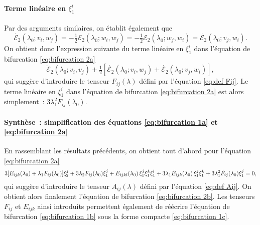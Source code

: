\documentclass{article}
\newcommand{\nocomma}{}
\begin{document}
\paragraph{Terme lin{\'e}aire en $\xi_1^i$}Par des arguments similaires, on
{\'e}tablit {\'e}galement que
\[ \dot{\mathcal{E}_2} (\lambda_0 ; v_i, w_j) = - \tfrac{1}{2} \mathcal{E}_2
   (\lambda_0 ; w_i, w_j) = - \tfrac{1}{2} \mathcal{E}_2 (\lambda_0 ; w_j,
   w_i) = \dot{\mathcal{E}_2} (\lambda_0 ; v_j, w_i) . \]
On obtient donc l'expression suivante du terme lin{\'e}aire en $\xi_1^i$ dans
l'{\'e}quation de bifurcation \eqref{eq:bifurcation 2a}
\[ \ddot{\mathcal{E}}_2 (\lambda_0 ; v_i, v_j) + \tfrac{1}{2}
   [\dot{\mathcal{E}_2} (\lambda_0 ; v_i, w_j) + \dot{\mathcal{E}_2}
   (\lambda_0 ; v_j, w_i)], \]
qui sugg{\`e}re d'introduire le tenseur $F_{i \nocomma j} (\lambda)$
d{\'e}fini par l'{\'e}quation \eqref{eq:def Fij}. Le terme lin{\'e}aire en
$\xi_1^i$ dans l'{\'e}quation de bifurcation \eqref{eq:bifurcation 2a} est
alors simplement~: $3 \lambda_1^2  \dot{F}_{i \nocomma j} (\lambda_0)$.

\paragraph{Synth{\`e}se~: simplification des {\'e}quations
\eqref{eq:bifurcation 1a} et \eqref{eq:bifurcation 2a}}En rassemblant les
r{\'e}sultats pr{\'e}c{\'e}dents, on obtient tout d'abord pour l'{\'e}quation
\eqref{eq:bifurcation 2a}
\[ 3 [E_{i \nocomma j \nocomma k} (\lambda_0) + \lambda_1 F_{i \nocomma j}
   (\lambda_0)] \xi_2^j + 3 \lambda_2 F_{i \nocomma j} (\lambda_0) \xi_1^j +
   E_{i \nocomma j \nocomma k \nocomma l} (\lambda_0)  \hspace{0.17em} \xi_1^j
   \xi_1^k \xi_1^l + 3 \lambda_1  \dot{E}_{i \nocomma j \nocomma k}
   (\lambda_0)  \hspace{0.17em} \xi_1^j \xi_1^k + 3 \lambda_1^2  \dot{F}_{i
   \nocomma j} (\lambda_0) \xi_1^j = 0, \]
qui sugg{\`e}re d'introduire le tenseur $A_{i \nocomma j} (\lambda)$
d{\'e}fini par l'{\'e}quation \eqref{eq:def Aij}. On obtient alors finalement
l'{\'e}quation de bifurcation \eqref{eq:bifurcation 2b}. Les tenseurs $F_{i
\nocomma j}$ et $E_{i \nocomma j \nocomma k}$ ainsi introduits permettent
{\'e}galement de r{\'e}{\'e}crire l'{\'e}quation de bifurcation
\eqref{eq:bifurcation 1b} sous la forme compacte \eqref{eq:bifurcation 1c}.
\end{document}
